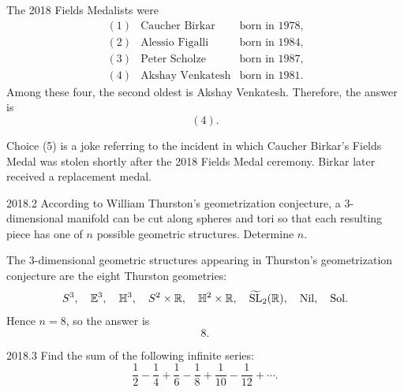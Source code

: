     \begin{solution}
        The 2018 Fields Medalists were
        \[
            \begin{array}{lll}
                (1) & \text{Caucher Birkar} & \text{born in 1978}, \\
                (2) & \text{Alessio Figalli} & \text{born in 1984}, \\
                (3) & \text{Peter Scholze} & \text{born in 1987}, \\
                (4) & \text{Akshay Venkatesh} & \text{born in 1981}.
            \end{array}
        \]
        Among these four, the second oldest is Akshay Venkatesh. Therefore, the answer is
        \[
            \boxed{(4)}.
        \]

        Choice (5) is a joke referring to the incident in which Caucher Birkar's Fields Medal was
        stolen shortly after the 2018 Fields Medal ceremony. Birkar later received a replacement
        medal.
    \end{solution}

    \begin{pastproblem}{2018.2}
        According to William Thurston's geometrization conjecture, a $3$-dimensional manifold can be
        cut along spheres and tori so that each resulting piece has one of $n$ possible geometric
        structures. Determine $n$.
    \end{pastproblem}

    \begin{solution}
        The $3$-dimensional geometric structures appearing in Thurston's geometrization conjecture
        are the eight Thurston geometries:
        \[
            S^3,\quad
            \mathbb{E}^3,\quad
            \mathbb{H}^3,\quad
            S^2 \times \mathbb{R},\quad
            \mathbb{H}^2 \times \mathbb{R},\quad
            \widetilde{\operatorname{SL}}_2(\mathbb{R}),\quad
            \mathrm{Nil},\quad
            \mathrm{Sol}.
        \]
        Hence $n=8$, so the answer is
        \[
            \boxed{8}.
        \]
    \end{solution}

    \begin{pastproblem}{2018.3}
        Find the sum of the following infinite series:
        \[
            \frac{1}{2}-\frac{1}{4}+\frac{1}{6}-\frac{1}{8}
            +\frac{1}{10}-\frac{1}{12}+\cdots.
        \]
    \end{pastproblem}

